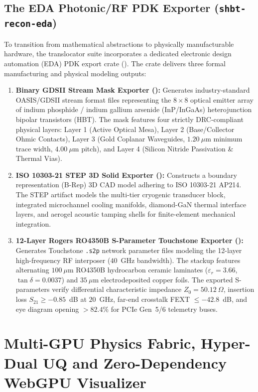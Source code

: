 \documentclass[11pt,onecolumn]{article}
\begin{document}
\subsection{The EDA Photonic/RF PDK Exporter (\texttt{shbt-recon-eda})}
\label{subsec:eda_pdk}
To transition from mathematical abstractions to physically manufacturable hardware, the translocator suite incorporates a dedicated electronic design automation (EDA) PDK export crate (). The crate delivers three formal manufacturing and physical modeling outputs:
\begin{enumerate}
    \item \textbf{Binary GDSII Stream Mask Exporter ():}
    Generates industry-standard OASIS/GDSII stream format files representing the $8\times 8$ optical emitter array of indium phosphide / indium gallium arsenide (InP/InGaAs) heterojunction bipolar transistors (HBT). The mask features four strictly DRC-compliant physical layers: Layer 1 (Active Optical Mesa), Layer 2 (Base/Collector Ohmic Contacts), Layer 3 (Gold Coplanar Waveguides, $1.20~\mu$m minimum trace width, $4.00~\mu$m pitch), and Layer 4 (Silicon Nitride Passivation \& Thermal Vias).
    \item \textbf{ISO 10303-21 STEP 3D Solid Exporter ():}
    Constructs a boundary representation (B-Rep) 3D CAD model adhering to ISO 10303-21 AP214. The STEP artifact models the multi-tier cryogenic transducer block, integrated microchannel cooling manifolds, diamond-GaN thermal interface layers, and aerogel acoustic tamping shells for finite-element mechanical integration.
    \item \textbf{12-Layer Rogers RO4350B S-Parameter Touchstone Exporter ():}
    Generates Touchstone \texttt{.s2p} network parameter files modeling the 12-layer high-frequency RF interposer ($40$~GHz bandwidth). The stackup features alternating $100~\mu$m RO4350B hydrocarbon ceramic laminates ($\varepsilon_r = 3.66$, $\tan\delta = 0.0037$) and $35~\mu$m electrodeposited copper foils. The exported S-parameters verify differential characteristic impedance $Z_0 = 50.12~\Omega$, insertion loss $S_{21} \ge -0.85$~dB at $20$~GHz, far-end crosstalk FEXT $\le -42.8$~dB, and eye diagram opening $>82.4\%$ for PCIe Gen~5/6 telemetry buses.
\end{enumerate}

\FloatBarrier
\section[Multi-GPU Physics, Hyper-Dual UQ and WebGPU Visualizer]{Multi-GPU Physics Fabric, Hyper-Dual UQ and Zero-Dependency WebGPU Visualizer}
\label{sec:compute}
\end{document}
